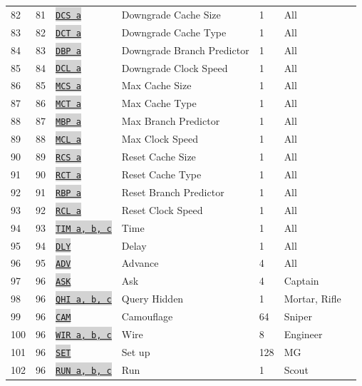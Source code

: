 \documentclass{article}
\newcommand{\vnscode}[1]{\colorbox{lightgray}{\lstinline[language=vns]{#1}}}
\begin{document}
\begin{longtable}{lllllll}
    82 & 81 & \hyperref[table:upgrade]{\vnscode{DCS a}} & Downgrade Cache Size & 1 & All \\
    83 & 82 & \hyperref[table:upgrade]{\vnscode{DCT a}} & Downgrade Cache Type & 1 & All \\
    84 & 83 & \hyperref[table:upgrade]{\vnscode{DBP a}} & Downgrade Branch Predictor & 1 & All \\
    85 & 84 & \hyperref[table:upgrade]{\vnscode{DCL a}} & Downgrade Clock Speed & 1 & All \\
    86 & 85 & \hyperref[table:upgrade]{\vnscode{MCS a}} & Max Cache Size & 1 & All \\
    87 & 86 & \hyperref[table:upgrade]{\vnscode{MCT a}} & Max Cache Type & 1 & All \\
    88 & 87 & \hyperref[table:upgrade]{\vnscode{MBP a}} & Max Branch Predictor & 1 & All \\
    89 & 88 & \hyperref[table:upgrade]{\vnscode{MCL a}} & Max Clock Speed & 1 & All \\
    90 & 89 & \hyperref[table:upgrade]{\vnscode{RCS a}} & Reset Cache Size & 1 & All \\
    91 & 90 & \hyperref[table:upgrade]{\vnscode{RCT a}} & Reset Cache Type & 1 & All \\
    92 & 91 & \hyperref[table:upgrade]{\vnscode{RBP a}} & Reset Branch Predictor & 1 & All \\
    93 & 92 & \hyperref[table:upgrade]{\vnscode{RCL a}} & Reset Clock Speed & 1 & All \\
    94 & 93 & \hyperref[table:time]{\vnscode{TIM a, b, c}} & Time & 1 & All \\
    95 & 94 & \hyperref[table:time]{\vnscode{DLY}} & Delay & 1 & All \\
    96 & 95 & \hyperref[table:time]{\vnscode{ADV}} & Advance & 4 & All \\
    97 & 96 & \hyperref[table:resource]{\vnscode{ASK}} & Ask & 4 & Captain \\
    98 & 96 & \hyperref[table:combat]{\vnscode{QHI a, b, c}} & Query Hidden & 1 & Mortar, Rifle \\
    99 & 96 & \hyperref[table:sniper]{\vnscode{CAM}} & Camouflage & 64 & Sniper \\
    100 & 96 & \hyperref[table:combat]{\vnscode{WIR a, b, c}} & Wire & 8 & Engineer \\
    101 & 96 & \hyperref[table:combat]{\vnscode{SET}} & Set up & 128 & MG \\
    102 & 96 & \hyperref[table:movement]{\vnscode{RUN a, b, c}} & Run & 1 & Scout \\

\end{longtable}
\end{document}
